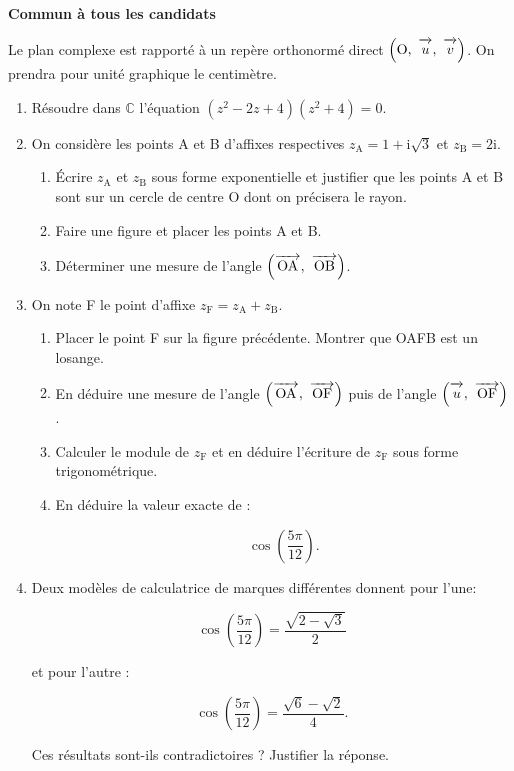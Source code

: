 \documentclass[10pt,a4paper]{article}
\newcommand{\C}{\mathbb{C}}
\newcommand{\vect}[1]{\overrightarrow{\,\mathstrut#1\,}}
\def\Ouv{$\left(\text{O},~\vect{u},~\vect{v}\right)$}
\begin{document}
\textbf{Commun à tous les candidats }

\bigskip

Le plan complexe est rapporté à un repère orthonormé direct \Ouv. On prendra pour unité graphique le centimètre.

\medskip

\begin{enumerate}
\item Résoudre dans $\C$ l'équation $\left(z^2 - 2z + 4\right)\left(z^2 + 4\right) = 0$.
\item On considère les points A et B d'affixes respectives $z_{\text{A}} = 1 + \text{i}\sqrt{3}$ et $z_{\text{B}} = 2\text{i}$.
	\begin{enumerate}
		\item Écrire $z_{\text{A}}$ et $z_{\text{B}}$ sous forme exponentielle et justifier que les points A et B sont sur un cercle de centre O dont on précisera le rayon.
		\item Faire une figure et placer les points A et B.
		\item Déterminer une mesure de l'angle $\left(\vect{\text{OA}},~\vect{\text{OB}}\right)$.
	\end{enumerate}
\item On note F le point d'affixe $z_{\text{F}} = z_{\text{A}} + z_{\text{B}}$.
	\begin{enumerate}
		\item Placer le point F sur la figure précédente. Montrer que OAFB est un losange.
		\item En déduire une mesure de l'angle $\left(\vect{\text{OA}},~\vect{\text{OF}}\right)$ puis de l'angle $\left(\vect{u},~\vect{\text{OF}}\right)$.
		\item Calculer le module de $z_{\text{F}}$ et en déduire l'écriture de $z_{\text{F}}$ sous forme trigonométrique.
		\item En déduire la valeur exacte de :
		
\[\cos \left(\dfrac{5\pi}{12}\right).\]

	\end{enumerate}
\item Deux modèles de calculatrice de marques différentes donnent pour l'une:

\[\cos \left(\dfrac{5\pi}{12}\right) = \dfrac{\sqrt{2 - \sqrt{3}}}{2}\]

et pour l'autre :

\[\cos \left(\dfrac{5\pi}{12}\right) = \dfrac{\sqrt{6} - \sqrt{2}}{4}.\]

Ces résultats sont-ils contradictoires ? Justifier la réponse.
\end{enumerate}
\end{document}
